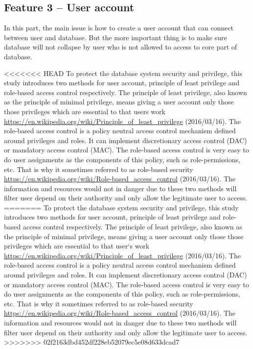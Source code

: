\documentclass[a4paper]{article} %
\begin{document}
\subsection*{Feature 3 -- User account}
\label{task1:feature3}

In this part, the main issue is how to create a user account that can connect between user and database. But the more important thing is to make sure database will not collapse by user who is not allowed to access to core part of database.

<<<<<<< HEAD
To protect the database system security and privilege, this study introduces two methods for user account, principle of least privilege and role-based access control respectively. The principle of least privilege, also known as the principle of minimal privilege, means giving a user account only those those privileges which are essential to that users work \url{https://en.wikipedia.org/wiki/Principle_of_least_privilege} (2016/03/16). The role-based access control is a policy neutral access control mechanism defined around privileges and roles. It can implement discretionary access control (DAC) or mandatory access control (MAC). The role-based access control is very easy to do user assignments as the components of this policy, such as role-permissions, etc. That is why it sometimes referred to as role-based security \url{https://en.wikipedia.org/wiki/Role-based_access_control} (2016/03/16). The information and resources would not in danger due to these two methods will filter user depend on their authority and only allow the legitimate user to access.
=======
To protect the database system security and privilege, this study introduces two methods for user account, principle of least privilege and role-based access control respectively. The principle of least privilege, also known as the principle of minimal privilege, means giving a user account only those those privileges which are essential to that user`s work \url{https://en.wikipedia.org/wiki/Principle_of_least_privilege} (2016/03/16). The role-based access control is a policy neutral access control mechanism defined around privileges and roles. It can implement discretionary access control (DAC) or mandatory access control (MAC). The role-based access control is very easy to do user assignments as the components of this policy, such as role-permissions, etc. That is why it sometimes referred to as role-based security \url{https://en.wikipedia.org/wiki/Role-based_access_control} (2016/03/16). The information and resources would not in danger due to these two methods will filter user depend on their authority and only allow the legitimate user to access.
>>>>>>> 02f2163dbd452df228eb52079ec5e08d633dcad7
\end{document}
